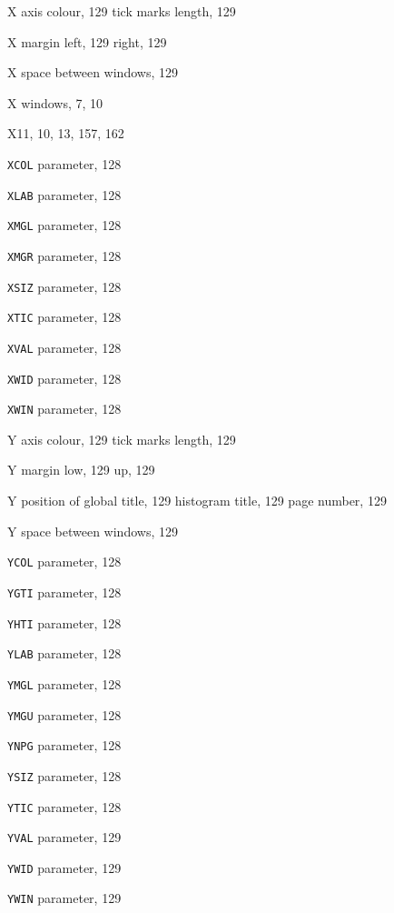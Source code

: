 \begin{theindex}
  \item X axis
    \subitem colour, 129
    \subitem tick marks length, 129
  \item X margin
    \subitem left, 129
    \subitem right, 129
  \item X space between windows, 129
  \item X windows, 7, 10
  \item X11, 10, 13, 157, 162
  \item {\tt XCOL}
     parameter, 128
  \item {\tt XLAB}
     parameter, 128
  \item {\tt XMGL}
     parameter, 128
  \item {\tt XMGR}
     parameter, 128
  \item {\tt XSIZ}
     parameter, 128
  \item {\tt XTIC}
     parameter, 128
  \item {\tt XVAL}
     parameter, 128
  \item {\tt XWID}
     parameter, 128
  \item {\tt XWIN}
     parameter, 128

  \indexspace

  \item Y axis
    \subitem colour, 129
    \subitem tick marks length, 129
  \item Y margin
    \subitem low, 129
    \subitem up, 129
  \item Y position of
    \subitem global title, 129
    \subitem histogram title, 129
    \subitem page number, 129
  \item Y space between windows, 129
  \item {\tt YCOL}
     parameter, 128
  \item {\tt YGTI}
     parameter, 128
  \item {\tt YHTI}
     parameter, 128
  \item {\tt YLAB}
     parameter, 128
  \item {\tt YMGL}
     parameter, 128
  \item {\tt YMGU}
     parameter, 128
  \item {\tt YNPG}
     parameter, 128
  \item {\tt YSIZ}
     parameter, 128
  \item {\tt YTIC}
     parameter, 128
  \item {\tt YVAL}
     parameter, 129
  \item {\tt YWID}
     parameter, 129
  \item {\tt YWIN}
     parameter, 129


\end{theindex}
